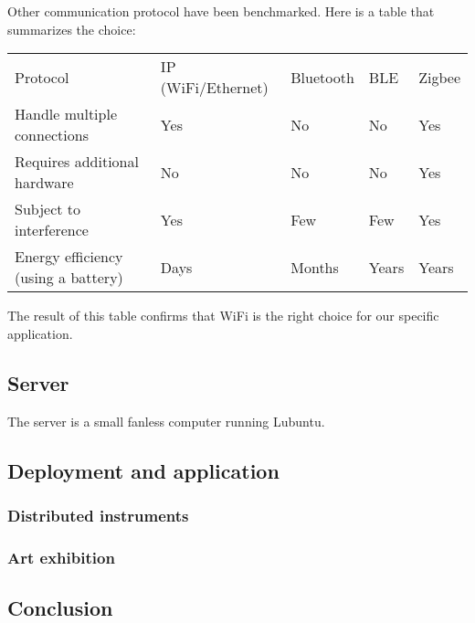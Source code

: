 Other communication protocol have been benchmarked. Here is a table that summarizes
the choice: 

\begin{table}[h!]
    \begin{tabular}{lllll}
    Protocol                            & IP (WiFi/Ethernet) & Bluetooth & BLE   & Zigbee \\
    Handle multiple connections         & Yes                & No        & No    & Yes    \\
    Requires additional hardware        & No                 & No        & No    & Yes    \\
    Subject to interference             & Yes                & Few       & Few   & Yes    \\
    Energy efficiency (using a battery) & Days               & Months    & Years & Years 
    \end{tabular}
\end{table}

The result of this table confirms that WiFi is the right choice for our specific application.
\subsection{Server}

The server is a small fanless computer running Lubuntu. 

\subsection{Deployment and application}

\subsubsection{Distributed instruments}

\subsubsection{Art exhibition}

\subsection{Conclusion}

